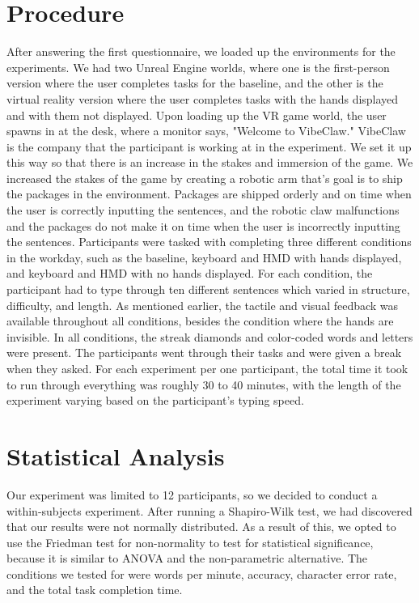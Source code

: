 \documentclass[acmlarge]{acmart}
\begin{document}
\section{Procedure}

After answering the first questionnaire, we loaded up the environments for the experiments. We had two Unreal Engine worlds, where one is the first-person version where the user completes tasks for the baseline, and the other is the virtual reality version where the user completes tasks with the hands displayed and with them not displayed. Upon loading up the VR game world, the user spawns in at the desk, where a monitor says, "Welcome to VibeClaw." VibeClaw is the company that the participant is working at in the experiment. We set it up this way so that there is an increase in the stakes and immersion of the game. We increased the stakes of the game by creating a robotic arm that's goal is to ship the packages in the environment. Packages are shipped orderly and on time when the user is correctly inputting the sentences, and the robotic claw malfunctions and the packages do not make it on time when the user is incorrectly inputting the sentences. Participants were tasked with completing three different conditions in the workday, such as the baseline, keyboard and HMD with hands displayed, and keyboard and HMD with no hands displayed. For each condition, the participant had to type through ten different sentences which varied in structure, difficulty, and length. As mentioned earlier, the tactile and visual feedback was available throughout all conditions, besides the condition where the hands are invisible. In all conditions, the streak diamonds and color-coded words and letters were present. The participants went through their tasks and were given a break when they asked. For each experiment per one participant, the total time it took to run through everything was roughly 30 to 40 minutes, with the length of the experiment varying based on the participant's typing speed.



\section{Statistical Analysis}
Our experiment was limited to 12 participants, so we decided to conduct a within-subjects experiment. After running a Shapiro-Wilk test, we had discovered that our results were not normally distributed. As a result of this, we opted to use the Friedman test for non-normality to test for statistical significance, because it is similar to ANOVA and the non-parametric alternative. The conditions we tested for were words per minute, accuracy, character error rate, and the total task completion time. 
\end{document}
